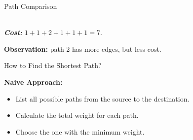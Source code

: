 \documentclass{beamer}
\begin{document}
\begin{frame}{Path Comparison}
\begin{minipage}{0.45\textwidth}
\begin{center}
\begin{tikzpicture}[node distance=6mm, main/.style = {draw, circle}]
            \end{tikzpicture}
    \end{center}  \\[1ex]
            \textit{\textbf{Cost:}} $1 + 1 + 2 + 1 + 1 + 1 = 7$. \\
        \end{minipage}
    
        \textbf{Observation:} path 2 has more edges, but less cost.
    \end{frame}
    
    \begin{frame}{How to Find the Shortest Path?}
        
        \textbf{Naive Approach:}
        \begin{itemize}
            \item List all possible paths from the source to the destination.
            \item Calculate the total weight for each path.
            \item Choose the one with the minimum weight.
        \end{itemize}
        
    \end{frame}
    
\end{document}
